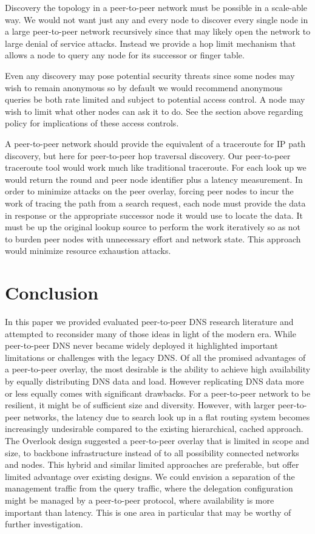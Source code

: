 \documentclass[sigconf]{acmart}
\begin{document}
Discovery the topology in a peer-to-peer network must be possible in a
scale-able way.  We would not want just any and every node to discover
every single node in a large peer-to-peer network recursively since that
may likely open the network to large denial of service attacks.  Instead
we provide a hop limit mechanism that allows a node to query any node
for its successor or finger table.

Even any discovery may pose potential security threats since some nodes
may wish to remain anonymous so by default we would recommend anonymous
queries be both rate limited and subject to potential access control.  A
node may wish to limit what other nodes can ask it to do.  See the
section above regarding policy for implications of these access
controls.

A peer-to-peer network should provide the equivalent of a traceroute for
IP path discovery, but here for peer-to-peer hop traversal discovery.
Our peer-to-peer traceroute tool would work much like traditional
traceroute.  For each look up we would return the round and peer node
identifier plus a latency measurement.  In order to minimize attacks on
the peer overlay, forcing peer nodes to incur the work of tracing the
path from a search request, each node must provide the data in response
or the appropriate successor node it would use to locate the data.  It
must be up the original lookup source to perform the work iteratively so
as not to burden peer nodes with unnecessary effort and network state.
This approach would minimize resource exhaustion attacks.

\section{Conclusion}

In this paper we provided evaluated peer-to-peer DNS research literature
and attempted to reconsider many of those ideas in light of the modern
era.  While peer-to-peer DNS never became widely deployed it highlighted
important limitations or challenges with the legacy DNS.  Of all the
promised advantages of a peer-to-peer overlay, the most desirable is the
ability to achieve high availability by equally distributing DNS data
and load.  However replicating DNS data more or less equally comes with
significant drawbacks.  For a peer-to-peer network to be resilient, it
might be of sufficient size and diversity.  However, with larger
peer-to-peer networks, the latency due to search look up in a flat
routing system becomes increasingly undesirable compared to the existing
hierarchical, cached approach.  The Overlook design suggested a
peer-to-peer overlay that is limited in scope and size, to backbone
infrastructure instead of to all possibility connected networks and
nodes.  This hybrid and similar limited approaches are preferable, but
offer limited advantage over existing designs.  We could envision a
separation of the management traffic from the query traffic, where the
delegation configuration might be managed by a peer-to-peer protocol,
where availability is more important than latency.  This is one area in
particular that may be worthy of further investigation.
\end{document}
